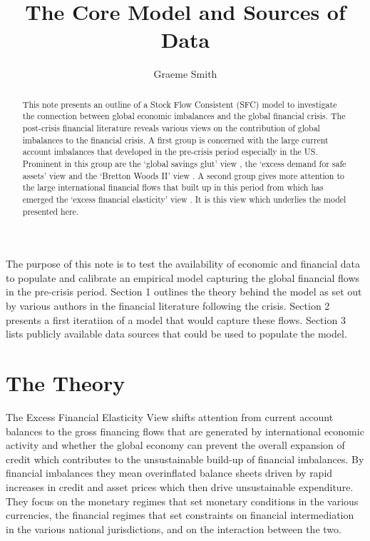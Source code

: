 \documentclass[twoside,a4paper,11pt]{article}
\title{The Core Model and Sources of Data}
\author{Graeme Smith}
\begin{document}
\maketitle
\begin{abstract} This note presents an outline of a Stock Flow Consistent (SFC) model to investigate the connection between global economic imbalances and the global financial crisis. The post-crisis financial literature reveals various views on the contribution of global imbalances to the financial crisis. A first group is concerned with the large current account imbalances that developed in the pre-crisis period especially in the US. Prominent in this group are the `global savings glut' view \cite{Bernanke2005},  the ‘excess demand for safe assets’ view \cite{Caballero2006} and the ‘Bretton Woods II’ view \cite{Dooley2003}. A second group gives more attention to the large international financial flows that built up in this period from which has emerged the `excess financial elasticity' view \cite{Borio2011b}. It is this view which underlies the model presented here.
\end{abstract}

The purpose of this note is to test the availability of economic and financial data to populate and calibrate an empirical model capturing the global financial flows in the pre-crisis period. Section 1 outlines the theory behind the model as set out by various authors in the financial literature following the crisis. Section 2 presents a first iteratiion of a model that would capture these flows. Section 3 lists publicly available data sources that could be used to populate the model.

\section{The Theory}
The Excess Financial Elasticity View \cite{Borio2011b} shifts attention  from current account balances to the gross financing flows that are generated by international economic activity and whether the global economy can prevent the overall expansion of credit which contributes to the unsustainable build-up of financial imbalances. By financial imbalances they mean overinflated balance sheets driven by rapid increases in credit and asset prices which then drive unsustainable expenditure. They focus on the monetary regimes that set monetary conditions in the various currencies, the financial regimes that set constraints on financial intermediation in the various national jurisdictions, and on the interaction between the two.
\end{document}
